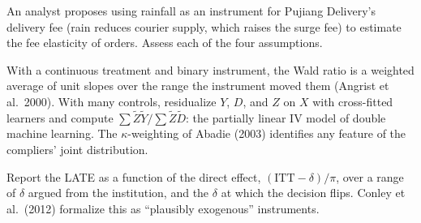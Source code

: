 \documentclass[11pt]{article}
\begin{document}
\begin{exercise}[judgment]
An analyst proposes using rainfall as an instrument for Pujiang Delivery's delivery fee (rain reduces courier supply, which raises the
surge fee) to estimate the fee elasticity of orders. Assess each of the four assumptions.
\end{exercise}

\sectionthree

\begin{extension}
With a continuous treatment and binary instrument, the Wald ratio is a weighted average of unit slopes over the range the instrument
moved them (Angrist et al.\ 2000). With many controls, residualize $Y$, $D$, and $Z$ on $X$ with cross-fitted learners and compute
$\sum\tilde Z\tilde Y/\sum\tilde Z\tilde D$: the partially linear IV model of double machine learning. The $\kappa$-weighting of Abadie (2003) identifies any feature of the
compliers' joint distribution.
\end{extension}

\begin{extension}
Report the LATE as a function of the direct effect, $(\text{ITT} - \delta)/\pi$, over a range of $\delta$ argued from the institution, and the
$\delta$ at which the decision flips. Conley et al.\ (2012) formalize this as ``plausibly exogenous'' instruments.
\end{extension}
\end{document}
